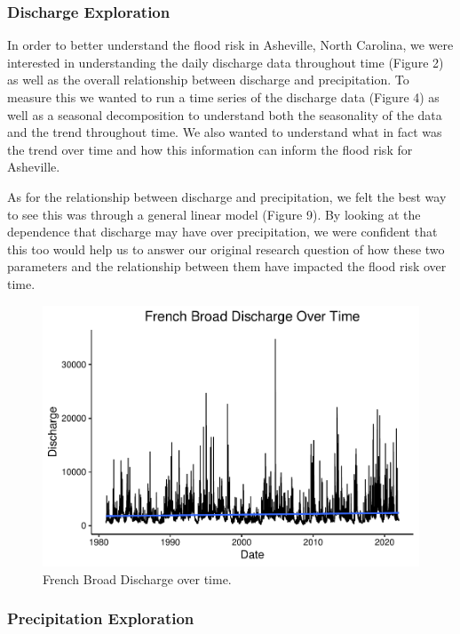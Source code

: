 \documentclass[
]{article}
\begin{document}
\hypertarget{discharge-exploration}{%
\subsubsection{\texorpdfstring{\textbf{Discharge
Exploration}}{Discharge Exploration}}\label{discharge-exploration}}

In order to better understand the flood risk in Asheville, North
Carolina, we were interested in understanding the daily discharge data
throughout time (Figure 2) as well as the overall relationship between
discharge and precipitation. To measure this we wanted to run a time
series of the discharge data (Figure 4) as well as a seasonal
decomposition to understand both the seasonality of the data and the
trend throughout time. We also wanted to understand what in fact was the
trend over time and how this information can inform the flood risk for
Asheville.

As for the relationship between discharge and precipitation, we felt the
best way to see this was through a general linear model (Figure 9). By
looking at the dependence that discharge may have over precipitation, we
were confident that this too would help us to answer our original
research question of how these two parameters and the relationship
between them have impacted the flood risk over time.

\begin{figure}
\centering
\includegraphics{SD_AD_NVT_EDAfinal_files/figure-latex/unnamed-chunk-7-1.pdf}
\caption{French Broad Discharge over time.}
\end{figure}

\hypertarget{precipitation-exploration}{%
\subsubsection{\texorpdfstring{\textbf{Precipitation
Exploration}}{Precipitation Exploration}}\label{precipitation-exploration}}
\end{document}
